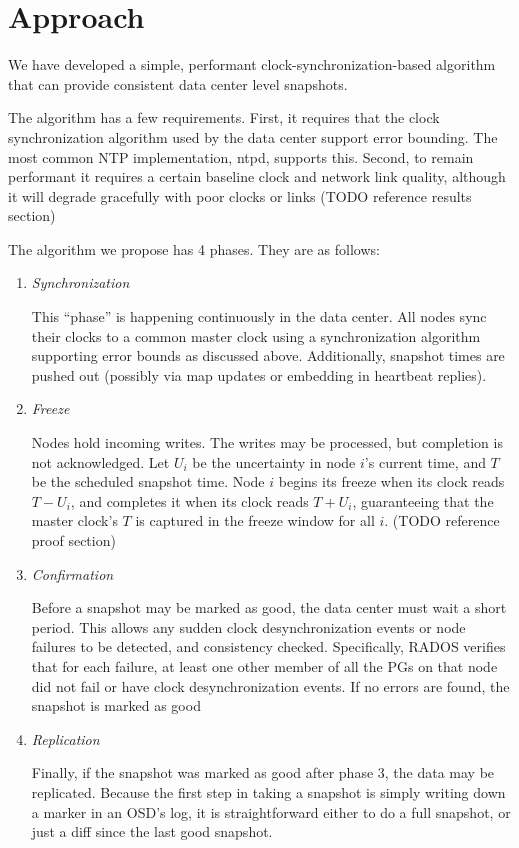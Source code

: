 \chapter{Approach}
\label{sec:approach}

We have developed a simple, performant clock-synchronization-based
algorithm that can provide consistent data center level snapshots.

The algorithm has a few requirements. First, it requires that the
clock synchronization algorithm used by the data center support error
bounding. The most common NTP implementation, ntpd, supports
this. Second, to remain performant it requires a certain baseline
clock and network link quality, although it will degrade gracefully
with poor clocks or links (TODO reference results section)

The algorithm we propose has 4 phases. They are as follows:

\begin{enumerate}

\item \emph{Synchronization}

  This “phase” is happening continuously in the data center. All nodes
  sync their clocks to a common master clock using a synchronization
  algorithm supporting error bounds as discussed above. Additionally,
  snapshot times are pushed out (possibly via map updates or embedding
  in heartbeat replies).

\item \emph{Freeze}
  
  Nodes hold incoming writes. The writes may be processed, but
  completion is not acknowledged. Let $U_i$ be the uncertainty in node
  $i$'s current time, and $T$ be the scheduled snapshot time. Node $i$
  begins its freeze when its clock reads $T - U_i$, and completes it
  when its clock reads $T + U_i$, guaranteeing that the master clock's
  $T$ is captured in the freeze window for all $i$. (TODO reference
  proof section)

\item \emph{Confirmation}

  Before a snapshot may be marked as good, the data center must wait a
  short period. This allows any sudden clock desynchronization events
  or node failures to be detected, and consistency
  checked. Specifically, RADOS verifies that for each failure, at
  least one other member of all the PGs on that node did not fail or
  have clock desynchronization events. If no errors are found, the
  snapshot is marked as good

\item \emph{Replication}
  
  Finally, if the snapshot was marked as good after phase 3, the data
  may be replicated. Because the first step in taking a snapshot is
  simply writing down a marker in an OSD's log, it is straightforward
  either to do a full snapshot, or just a diff since the last good
  snapshot.

\end{enumerate}

